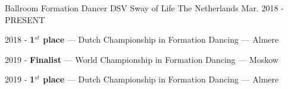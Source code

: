 
\begin{cventries}




  \cventry
    {Ballroom Formation Dancer} %
    {DSV Sway of Life} %
    {The Netherlands} %
    {Mar. 2018 - PRESENT} %
    {
      \begin{cvitems} %
        \item {2018 - \textbf{1$^{st}$ place} --- Dutch Championship in Formation Dancing --- Almere}
        \item {2019 - \textbf{Finalist} --- World Championship in Formation Dancing --- Moskow}
        \item {2019 - \textbf{1$^{st}$ place} --- Dutch Championship in Formation Dancing --- Almere}
      \end{cvitems}
    }


\end{cventries}
